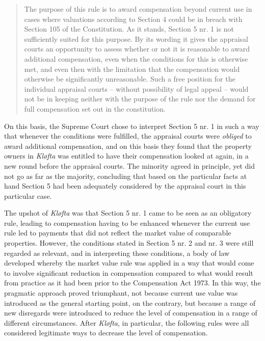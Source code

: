 \documentclass[10pt]{article} %
\begin{document}
\begin{quote}
The purpose of this rule is to award compensation beyond current use in cases where valuations according to Section 4 could be in breach with Section 105 of the Constitution. As it stands, Section 5 nr. 1 is not sufficiently suited for this purpose. By its wording it gives the appraisal courts an opportunity to assess whether or not it is reasonable to award additional compensation, even when the conditions for this is otherwise met, and even then with the limitation that the compensation would otherwise be significantly unreasonable. Such a free position for the individual appraisal courts -- without possibility of legal appeal -- would not be in keeping neither with the purpose of the rule nor the demand for full compensation set out in the constitution.
\end{quote}

On this basis, the Supreme Court chose to interpret Section 5 nr. 1 in such a way that whenever the conditions were fulfilled, the appraisal courts were \emph{obliged} to award additional compensation, and on this basis they found that the property owners in \emph{Kløfta} was entitled to have their compensation looked at again, in a new round before the appraisal courts. The minority agreed in principle, yet did not go as far as the majority, concluding that based on the particular facts at hand Section 5 had been adequately considered by the appraisal court in this particular case.

The upshot of \emph{Kløfta} was that Section 5 nr. 1 came to be seen as an obligatory rule, leading to compensation having to be enhanced whenever the current use rule led to payments that did not reflect the market value of comparable properties. However, the conditions stated in Section 5 nr. 2 and nr. 3 were still regarded as relevant, and in interpreting these conditions, a body of law developed whereby the market value rule was applied in a way that would come to involve significant reduction in compensation compared to what would result from practice as it had been prior to the Compensation Act 1973. In this way, the pragmatic approach proved triumphant, not because current use value was introduced as the general starting point, on the contrary, but because a range of new disregards were introduced to reduce the level of compensation in a range of different circumstances. After \emph{Kløfta}, in particular, the following rules were all considered legitimate ways to decrease the level of compensation.
\end{document}
